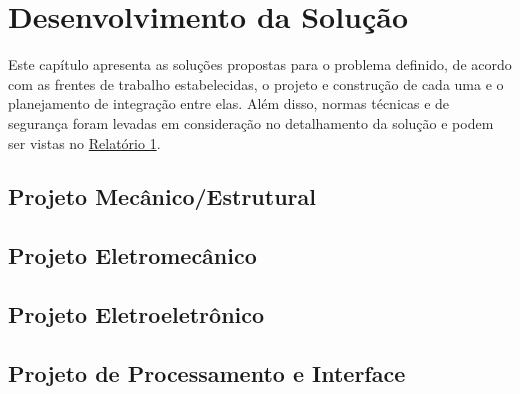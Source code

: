\chapter{Desenvolvimento da Solução}
\label{desenvolvimento}

Este capítulo apresenta as soluções propostas para o problema definido, de acordo com as frentes de trabalho estabelecidas, o projeto
e construção de cada uma e o planejamento de integração entre elas. 
Além disso, normas técnicas e de segurança foram levadas em consideração no detalhamento da solução e podem ser vistas no 
\href{https://drive.google.com/file/d/0B5InkGKx6O-MR1B3eVYzZFpjQ3c/view?usp=sharing}{Relatório 1}. 

\section{Projeto Mecânico/Estrutural}



\section{Projeto Eletromecânico}



\section{Projeto Eletroeletrônico}



\section{Projeto de Processamento e Interface}




